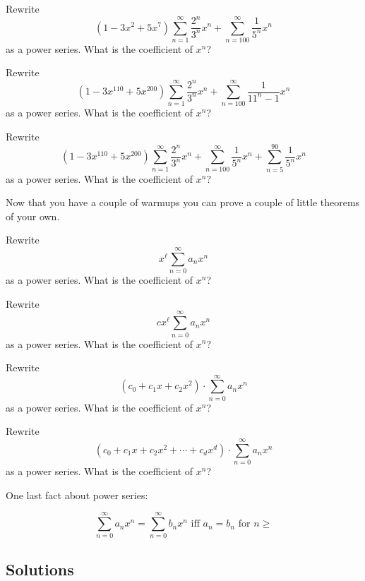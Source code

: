 \newpage

\newpage
\begin{ex}
Rewrite 
\[
(1 - 3x^2 + 5x^7) \sum_{n = 1}^\infty \frac{2^n}{3^n}x^n
+ \sum_{n=100}^\infty \frac{1}{5^n}x^n 
\]
as a
power series.
What is the coefficient of $x^n$?
\end{ex}

\newpage
\begin{ex}
Rewrite 
\[
(1 - 3x^{110} + 5x^{200}) \sum_{n = 1}^\infty \frac{2^n}{3^n}x^n
+ \sum_{n=100}^\infty \frac{1}{11^n - 1}x^n
\] as a
power series.
What is the coefficient of $x^n$?
\end{ex}

\newpage
\begin{ex}
Rewrite 
\[
(1 - 3x^{110} + 5x^{200}) \sum_{n = 1}^\infty \frac{2^n}{3^n}x^n
+ \sum_{n=100}^\infty \frac{1}{5^n}x^n
+ \sum_{n=5}^{90} \frac{1}{5^n}x^n 
\] as a
power series.
What is the coefficient of $x^n$?
\end{ex}

\newpage
Now that you have a couple of warmups you can prove
a couple of little theorems of your own.

\begin{ex}
Rewrite 
\[
x^\ell \sum_{n = 0}^\infty a_n x^n
\] 
as a
power series.
What is the coefficient of $x^n$?
\end{ex}

\newpage
\begin{ex}
Rewrite 
\[
cx^\ell \sum_{n = 0}^\infty a_n x^n
\] 
as a
power series.
What is the coefficient of $x^n$?
\end{ex}

\newpage
\begin{ex}
Rewrite 
\[
(c_0 + c_1x + c_2 x^2) \cdot \sum_{n = 0}^\infty a_n x^n
\] 
as a
power series.
What is the coefficient of $x^n$?
\end{ex}

\newpage
\begin{ex}
Rewrite 
\[
(c_0 + c_1x + c_2 x^2 + \cdots + c_d x^d) \cdot \sum_{n = 0}^\infty a_n x^n
\] 
as a
power series.
What is the coefficient of $x^n$?
\end{ex}


\newpage
One last fact about power series:

\[
\sum_{n = 0}^\infty a_nx^n =
\sum_{n = 0}^\infty b_nx^n
\text{ iff }
a_n = b_n \text{ for } n \geq 
\]

\newpage
\subsection*{Solutions}

